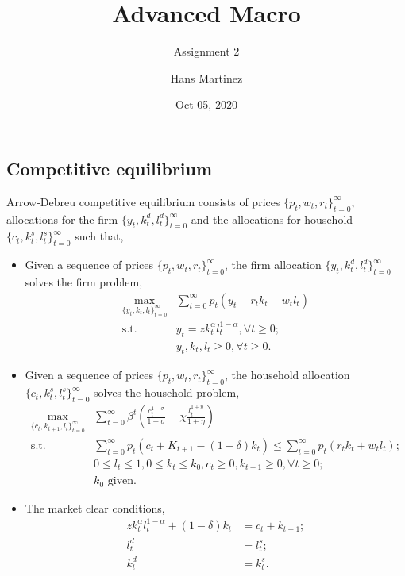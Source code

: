 \documentclass[]{article}
\title{Advanced Macro}
\subtitle{Assignment 2}
\author{Hans Martinez}
\date{Oct 05, 2020}
\begin{document}
\maketitle

\hypertarget{competitive-equilibrium}{%
\subsection{Competitive equilibrium}\label{competitive-equilibrium}}

Arrow-Debreu competitive equilibrium consists of prices
\(\{p_t,w_t,r_t\}_{t=0}^{\infty}\), allocations for the firm
\(\{y_t,k_t^d,l_t^d\}_{t=0}^{\infty}\) and the allocations for household
\(\{c_t,k_t^s,l_t^s\}_{t=0}^{\infty}\) such that,

\begin{itemize}
\item
  Given a sequence of prices \(\{p_t,w_t,r_t\}_{t=0}^{\infty}\), the
  firm allocation \(\{y_t,k_t^d,l_t^d\}_{t=0}^{\infty}\) solves the firm
  problem, \begin{equation}
            \begin{split}
                \max_{\{y_t,k_t,l_t\}_{t=0}^{\infty}}&\sum_{t=0}^{\infty}
                p_t(y_t-r_tk_t-w_tl_t)\\
                \text{s.t.  }&y_t=zk_t^{\alpha}l_t^{1-\alpha}, \forall t\geq 0;\\
                &y_t,k_t,l_t\geq 0, \forall t \geq 0.
            \end{split}
            \end{equation}
\item
  Given a sequence of prices \(\{p_t,w_t,r_t\}_{t=0}^{\infty}\), the
  household allocation \(\{c_t,k_t^s,l_t^s\}_{t=0}^{\infty}\) solves the
  household problem, \begin{equation}
            \begin{split}
                \max_{\{c_t,k_{t+1},l_t\}_{t=0}^{\infty}}&\sum_{t=0}^{\infty}
                \beta ^t(\frac{c_t^{1-\sigma}}{1-\sigma}-\chi \frac{l_t^{1+\eta}}{1+\eta})\\
                \text{s.t.  }& \sum_{t=0}^{\infty}p_t(c_t+K_{t+1}-(1-\delta)k_t)
                \leq\sum_{t=0}^{\infty}p_t(r_tk_t+w_tl_t);\\
                &0\leq l_t\leq 1,0\leq k_t\leq k_0, c_t\geq 0, k_{t+1}\geq 0,\forall t \geq 0;\\
                &k_0 \text{ given.}
            \end{split}
            \end{equation}
\item
  The market clear conditions, \begin{equation*}
            \begin{split}
                zk_t^{\alpha}l_t^{1-\alpha}+(1-\delta)k_t&=c_t+k_{t+1} ;\\
                l_t^d&=l_t^s    ;\\
                k_t^d&=k_t^s    .
            \end{split}
            \end{equation*}
\end{itemize}
\end{document}
